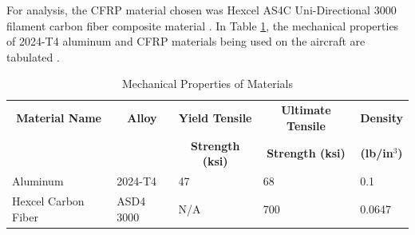 


For analysis, the CFRP material chosen was Hexcel AS4C Uni-Directional 3000 filament carbon fiber composite material \cite{hexcel}. In Table \ref{tab:material_properties}, the mechanical properties of 2024-T4 aluminum and CFRP materials being used on the aircraft are tabulated \cite{aluminum}.

\begin{table}[!h]
\centering
\caption{Mechanical Properties of Materials}
\begin{tabular}{|p{3cm}||p{2cm}|p{2.5cm}|p{2.5cm}|p{2cm}| }
\toprule
\multicolumn{1}{|c||}{\textbf{Material Name}} & \multicolumn{1}{c|}{\textbf{Alloy}} &  
\multicolumn{1}{c|}{\textbf{Yield Tensile}} & \multicolumn{1}{c|}{\textbf{Ultimate Tensile}} & \multicolumn{1}{c|}{\textbf{Density}} \\ 
\multicolumn{1}{|c||}{\textbf{}} & \multicolumn{1}{c|}{} &  
\multicolumn{1}{c|}{\textbf{Strength (ksi)}} & \multicolumn{1}{c|}{\textbf{Strength (ksi)}} & \multicolumn{1}{c|}{\textbf{(lb/in$^3$)}} \\ \hline \hline
Aluminum & 2024-T4 & 47 & 68 & 0.1 \\ \hline
Hexcel Carbon Fiber & ASD4 3000 & N/A & 700 & 0.0647 \\ \hline
\bottomrule
\end{tabular}
\label{tab:material_properties}
\end{table}


